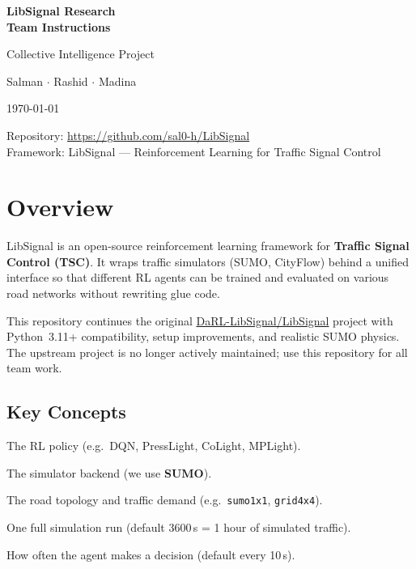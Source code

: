 \documentclass[11pt,a4paper]{article}
\begin{document}
\begin{titlepage}
\centering
\vspace*{3cm}
{\Huge\bfseries LibSignal Research\\[0.4cm] Team Instructions\par}
\vspace{1.5cm}
{\Large Collective Intelligence Project\par}
\vspace{1cm}
{\large Salman $\cdot$ Rashid $\cdot$ Madina\par}
\vspace{2cm}
{\large \today\par}
\vfill
{\normalsize
Repository: \url{https://github.com/sal0-h/LibSignal}\\[0.3cm]
Framework: LibSignal --- Reinforcement Learning for Traffic Signal Control}
\end{titlepage}

\tableofcontents
\newpage

\section{Overview}

LibSignal is an open-source reinforcement learning framework for \textbf{Traffic Signal Control (TSC)}.
It wraps traffic simulators (SUMO, CityFlow) behind a unified interface so that different RL agents can be trained and evaluated on various road networks without rewriting glue code.

This repository continues the original \href{https://github.com/DaRL-LibSignal/LibSignal}{DaRL-LibSignal/LibSignal} project with Python~3.11+ compatibility, setup improvements, and realistic SUMO physics. The upstream project is no longer actively maintained; use this repository for all team work.

\subsection{Key Concepts}
\begin{description}[leftmargin=3cm, style=nextline]
    \item[Agent] The RL policy (e.g.\ DQN, PressLight, CoLight, MPLight).
    \item[World] The simulator backend (we use \textbf{SUMO}).
    \item[Network] The road topology and traffic demand (e.g.\ \texttt{sumo1x1}, \texttt{grid4x4}).
    \item[Episode] One full simulation run (default 3600\,s = 1 hour of simulated traffic).
    \item[Action Interval] How often the agent makes a decision (default every 10\,s).
\end{description}
\end{document}
